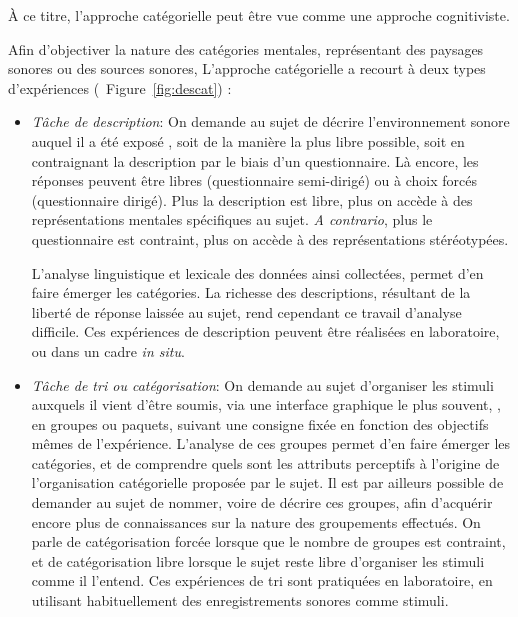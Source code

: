 À ce titre, l'approche catégorielle peut être vue comme une approche cognitiviste. 

Afin d'objectiver la nature des catégories mentales, représentant des paysages sonores ou des sources sonores, L'approche catégorielle a recourt à deux types d'expériences (\cf~Figure~\ref{fig:descat}) :

\begin{itemize}
\item \emph{Tâche de description}: On demande au sujet de décrire l'environnement sonore auquel il a été exposé \citep{axelsson2005soundscape,raimbault2005urban,guastavino2006ideal,raimbault2006qualitative}, soit de la manière la plus libre possible, soit en contraignant la description par le biais d'un questionnaire. Là encore, les réponses peuvent être libres (questionnaire semi-dirigé) ou à choix forcés (questionnaire dirigé). Plus la description est libre, plus on accède à des représentations mentales spécifiques au sujet. \emph{A contrario}, plus le questionnaire est contraint, plus on accède à des représentations stéréotypées. 

L'analyse linguistique et lexicale des données ainsi collectées, permet d'en faire émerger les catégories. La richesse des descriptions, résultant de la liberté de réponse laissée au sujet, rend cependant ce travail d'analyse difficile. Ces expériences de description peuvent être réalisées en laboratoire, ou dans un cadre \emph{in situ}.

\item \emph{Tâche de tri ou catégorisation}: On demande au sujet d'organiser les stimuli auxquels il vient d'être soumis, via une interface graphique le plus souvent, \citep{maffiolo_caracterisation_1999,guastavino2007categorization}, en groupes ou paquets, suivant une consigne fixée en fonction des objectifs mêmes de l'expérience. L'analyse de ces groupes permet d'en faire émerger les catégories, et de comprendre quels sont les attributs perceptifs à l'origine de l'organisation catégorielle proposée par le sujet. Il est par ailleurs possible de demander au sujet de nommer, voire de décrire ces groupes, afin d'acquérir encore plus de connaissances sur la nature des groupements effectués. On parle de catégorisation forcée lorsque que le nombre de groupes est contraint, et de catégorisation libre lorsque le sujet reste libre d'organiser les stimuli comme il l'entend. Ces expériences de tri sont pratiquées en laboratoire, en utilisant habituellement des enregistrements sonores comme stimuli.
\end{itemize}

